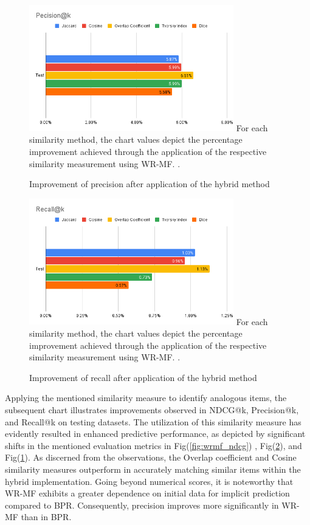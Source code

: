 \documentclass[journal]{IEEEtran}
\begin{document}
\begin{figure}[!t]
  \centering
  \includegraphics[width=3.5in]{picture/WR_MF-Pecision@k.png}
  For each similarity method, the chart values depict the percentage improvement achieved through the application of the respective 
  similarity measurement using WR-MF.
  \DeclareGraphicsExtensions.
  \caption{Improvement of precision after application of the hybrid method}
  \label{fig:wrmf_precision}
\end{figure}

\begin{figure}[!t]
  \centering
  \includegraphics[width=3.5in]{picture/WR_MF-Recall@k.png}
  For each similarity method, the chart values depict the percentage improvement achieved through the application of the respective 
  similarity measurement using WR-MF.
  \DeclareGraphicsExtensions.
  \caption{Improvement of recall after application of the hybrid method}
  \label{fig:wrmf_recall}
\end{figure}

Applying the mentioned similarity measure to identify analogous items, the subsequent chart illustrates improvements observed in 
NDCG@k, Precision@k, and Recall@k on testing datasets. The utilization of this similarity measure has evidently resulted in 
enhanced predictive performance, as depicted by significant shifts in the mentioned evaluation metrics in Fig(\ref{fig:wrmf_ndcg}) 
, Fig(\ref{fig:wrmf_recall}), and Fig(\ref{fig:wrmf_precision}). As discerned from the observations, the Overlap coefficient and Cosine similarity measures outperform 
in accurately matching similar items within the hybrid implementation. Going beyond numerical scores, it is noteworthy that WR-MF 
exhibits a greater dependence on initial data for implicit prediction compared to BPR. Consequently, precision improves more 
significantly in WR-MF than in BPR.
\end{document}

